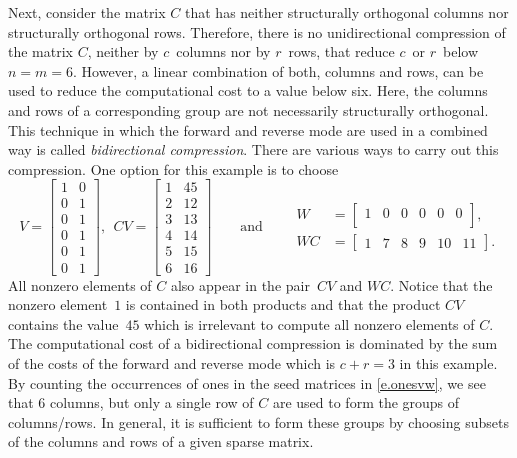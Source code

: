 \documentclass[12pt, oneside]{book}
\newcommand{\col}{\ensuremath{c}}
\newcommand{\row}{\ensuremath{r}}
\begin{document}
Next, consider the matrix $C$ that has neither structurally orthogonal columns nor
structurally orthogonal rows. Therefore, there is no unidirectional compression of the
matrix $C$, neither by \col\ columns nor by \row\ rows, that reduce \col\ or \row\ below
$n = m = 6$. However, a linear combination of both, columns and rows, can be used to
reduce the computational cost to a value below six. Here, the columns and rows of a
corresponding group are not necessarily structurally orthogonal. This technique in which
the forward and reverse mode are used in a combined way is called \emph{bidirectional
compression}. There are various ways to carry out this compression. One option for this
example is to choose
\begin{equation}
\label{e.onesvw}
V =
\begin{bmatrix}
 1  & 0\\
 0  & 1 \\
 0  & 1 \\
 0  & 1 \\
 0  & 1\\
 0  & 1
\end{bmatrix},\;\,
%
CV =
\begin{bmatrix}
 1  & 45\\
 2  & 12 \\
 3  & 13 \\
 4  & 14 \\
 5  & 15\\
 6  & 16
\end{bmatrix}
\qquad\text{and}\qquad
\begin{aligned}
  W &=
   \begin{bmatrix}
    1  & 0 & 0 & 0 & 0 & 0\\
   \end{bmatrix}, \\[1em]
  WC &=
   \begin{bmatrix}
    1  & 7 & 8 & 9 & 10 & 11
   \end{bmatrix}.
\end{aligned}
\end{equation}
All nonzero elements of $C$ also appear in the pair~$CV$ and $WC$. Notice that the
nonzero element~$1$ is contained in both products and that the product $CV$ contains the
value~$45$ which is irrelevant to compute all nonzero elements of $C$. The computational
cost of a bidirectional compression is dominated by the sum of the costs of the forward
and reverse mode which is $\col + \row = 3$ in this example. By counting the occurrences
of ones in the seed matrices in \eqref{e.onesvw}, we see that 6 columns, but only a
single row of $C$ are used to form the groups of columns/rows. In general, it is
sufficient to form these groups by choosing subsets of the columns and rows of a given
sparse matrix.
\end{document}
